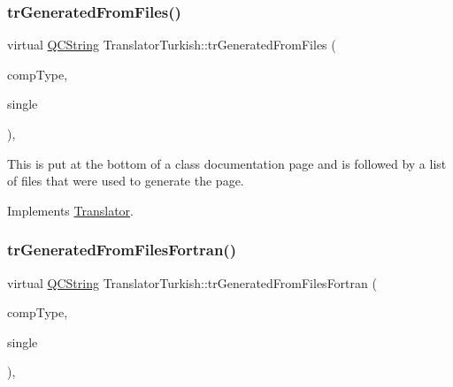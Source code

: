 \mbox{\label{class_translator_turkish_af5826bda74f4a54be6de89029f7d6f84}} 
\subsubsection{\texorpdfstring{trGeneratedFromFiles()}{trGeneratedFromFiles()}}
{\footnotesize\ttfamily virtual \mbox{\hyperlink{class_q_c_string}{Q\+C\+String}} Translator\+Turkish\+::tr\+Generated\+From\+Files (\begin{DoxyParamCaption}\item[{\mbox{\hyperlink{class_class_def_ae70cf86d35fe954a94c566fbcfc87939}{Class\+Def\+::\+Compound\+Type}}}]{comp\+Type,  }\item[{bool}]{single }\end{DoxyParamCaption})\hspace{0.3cm}{\ttfamily [inline]}, {\ttfamily [virtual]}}

This is put at the bottom of a class documentation page and is followed by a list of files that were used to generate the page. 

Implements \mbox{\hyperlink{class_translator}{Translator}}.

\mbox{\label{class_translator_turkish_aeeee6501498b0b44eb6d8927f76c422e}} 
\subsubsection{\texorpdfstring{trGeneratedFromFilesFortran()}{trGeneratedFromFilesFortran()}}
{\footnotesize\ttfamily virtual \mbox{\hyperlink{class_q_c_string}{Q\+C\+String}} Translator\+Turkish\+::tr\+Generated\+From\+Files\+Fortran (\begin{DoxyParamCaption}\item[{\mbox{\hyperlink{class_class_def_ae70cf86d35fe954a94c566fbcfc87939}{Class\+Def\+::\+Compound\+Type}}}]{comp\+Type,  }\item[{bool}]{single }\end{DoxyParamCaption})\hspace{0.3cm}{\ttfamily [inline]}, {\ttfamily [virtual]}}


